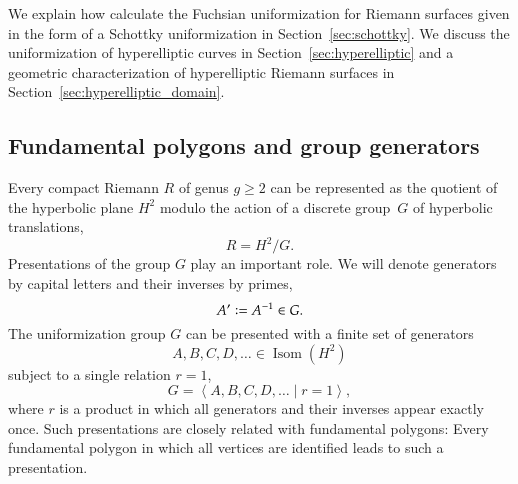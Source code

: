\documentclass[Thesis]{subfiles}
\begin{document}
We explain how calculate the Fuchsian uniformization for Riemann
surfaces given in the form of a Schottky uniformization in
Section~\ref{sec:schottky}. We discuss the uniformization of
hyperelliptic curves in Section~\ref{sec:hyperelliptic} and a
geometric characterization of hyperelliptic Riemann surfaces in
Section~\ref{sec:hyperelliptic_domain}. 


\subsection{Fundamental polygons and group generators}
\label{sec:polygons_generators}

Every compact Riemann $R$ of genus $g\geq 2$ can be represented as the
quotient of the hyperbolic plane $H^{2}$ modulo the action of a discrete
group~$G$ of hyperbolic translations,
\begin{equation}
R=H^{2} / G.
\end{equation}
Presentations of the group $G$ play an important role. We will denote
generators by capital letters and their inverses by primes,
\begin{equation}
  A'\vcentcolon=A^{-1}\in G.
\end{equation}
The uniformization group $G$ can be presented with a finite set of
generators 
\begin{equation*}
A,B,C,D,\ldots\in\operatorname{Isom}(H^{2})
\end{equation*}
subject to a single relation $r=1$,
\begin{equation}
G=\left<A,B,C,D,\ldots\mid r=1\right>,
\end{equation}
where $r$ is a product in which all generators and their inverses
appear exactly once. Such presentations are closely related with
fundamental polygons: Every fundamental polygon in which all vertices
are identified leads to such a presentation.
\end{document}
